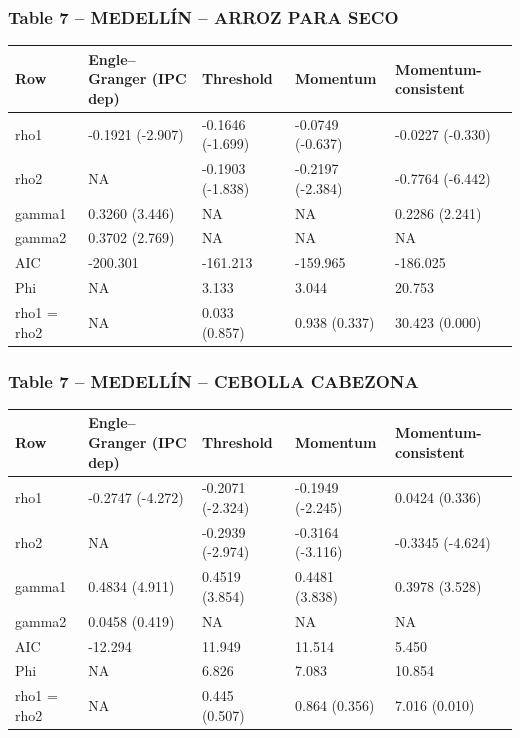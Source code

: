 \documentclass[
  12pt,
]{article}
\begin{document}
\subsubsection{Table 7 -- MEDELLÍN -- ARROZ PARA
SECO}\label{table-7-medelluxedn-arroz-para-seco}

\begin{longtable}[t]{lllll}
\toprule
Row & Engle–Granger (IPC dep) & Threshold & Momentum & Momentum-consistent\\
\midrule
rho1 & -0.1921 (-2.907) & -0.1646 (-1.699) & -0.0749 (-0.637) & -0.0227 (-0.330)\\
rho2 & NA & -0.1903 (-1.838) & -0.2197 (-2.384) & -0.7764 (-6.442)\\
gamma1 & 0.3260 (3.446) & NA & NA & 0.2286 (2.241)\\
gamma2 & 0.3702 (2.769) & NA & NA & NA\\
AIC & -200.301 & -161.213 & -159.965 & -186.025\\
\addlinespace
Phi & NA & 3.133 & 3.044 & 20.753\\
rho1 = rho2 & NA & 0.033 (0.857) & 0.938 (0.337) & 30.423 (0.000)\\
\bottomrule
\end{longtable}

\subsubsection{Table 7 -- MEDELLÍN -- CEBOLLA
CABEZONA}\label{table-7-medelluxedn-cebolla-cabezona}

\begin{longtable}[t]{lllll}
\toprule
Row & Engle–Granger (IPC dep) & Threshold & Momentum & Momentum-consistent\\
\midrule
rho1 & -0.2747 (-4.272) & -0.2071 (-2.324) & -0.1949 (-2.245) & 0.0424 (0.336)\\
rho2 & NA & -0.2939 (-2.974) & -0.3164 (-3.116) & -0.3345 (-4.624)\\
gamma1 & 0.4834 (4.911) & 0.4519 (3.854) & 0.4481 (3.838) & 0.3978 (3.528)\\
gamma2 & 0.0458 (0.419) & NA & NA & NA\\
AIC & -12.294 & 11.949 & 11.514 & 5.450\\
\addlinespace
Phi & NA & 6.826 & 7.083 & 10.854\\
rho1 = rho2 & NA & 0.445 (0.507) & 0.864 (0.356) & 7.016 (0.010)\\
\bottomrule
\end{longtable}
\end{document}
